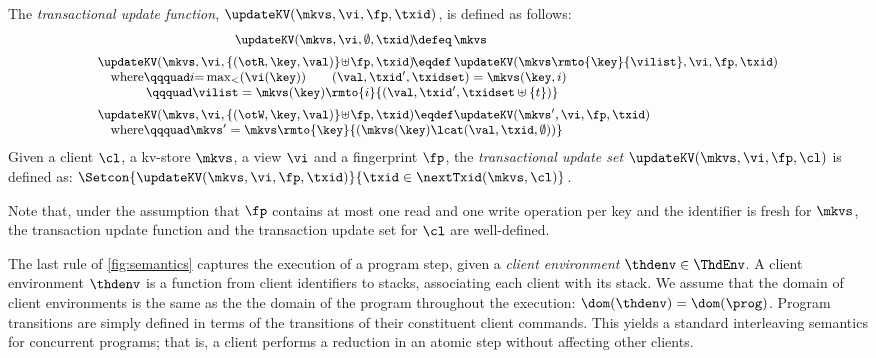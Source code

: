 \begin{definition}
\label{eq:updatekv}
\label{def:updatekv}
The \emph{transactional update function},  $\updateKV(\mkvs, \vi, \fp, \txid)$,  is
defined as follows:
%
{%
\[%
\small
\begin{array}{@{} l @{}}
	\begin{array}{@{} r @{} l @{}}
		\updateKV(\mkvs, \vi, \emptyset, \txid) \!\defeq\,  & \mkvs \vspace{5pt}\\
	    \updateKV(\mkvs, \vi, \{(\otR, \key, \val)\} \!\uplus\! \fp, \txid) 
	    \!\eqdef\, & 
	    \updateKV(\mkvs\rmto{\key}{\vilist},\vi, \fp, \txid)
	\end{array}\\
%	
	\quad\text{where} 
	\qqquad 
	i {=} \max_{<}(\vi(\key)) \qquad (\val, \txid', \txidset) = \mkvs(\key, i) \\
	\quad\phantom{where} 
	\qqquad 
	\vilist = \mkvs(\key)\rmto{i}{(\val, \txid', \txidset \uplus \{ t \})} \vspace{5pt}\\
%	
	\updateKV(\mkvs, \vi, \{(\otW, \key, \val)\} \!\uplus\! \fp, \txid) 
    	\eqdef
    \updateKV(\mkvs', \vi, \fp, \txid) \\
%
 	\quad\text{where} 
	\qqquad 
	\mkvs' = \mkvs\rmto{\key}{ ( \mkvs(\key) \lcat (\val, \txid, \emptyset) ) }   
\end{array}
\]%
}%
%
Given a client $\cl$, a kv-store $\mkvs$, a view $\vi$ and a fingerprint $\fp$, 
the \emph{transactional update set} $\updateKV(\mkvs, \vi, \fp, \cl)$ is defined as:  
$\Setcon{\updateKV(\mkvs, \vi, \fp, \txid)}{\txid \in \nextTxid(\mkvs, \cl)}$.
\end{definition}

Note that,  under the assumption that $\fp$ contains at most one read and one write 
operation per key and the identifier is fresh for $\mkvs$, 
the transaction update function and the transaction update set for
$\cl$ are well-defined. 

The last rule of \cref{fig:semantics} captures the execution of a program step, 
given a \emph{client environment} $\thdenv \in \ThdEnv$. 
A client environment $\thdenv$ is a function from client identifiers to stacks, associating each client with its stack. 
We assume that the domain of client environments is the same as the
the domain of the program throughout the execution: 
$\dom(\thdenv) = \dom(\prog)$.
Program transitions are simply defined in terms of the transitions of
their constituent client commands. 
This  yields a  standard interleaving semantics for concurrent
programs; 
that is, 
a client performs a reduction in an atomic step without
affecting other clients. 
